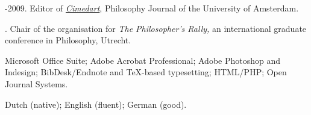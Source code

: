 \documentclass[11pt]{article}
\begin{document}
-2009. Editor of \href{http://www.cimedart.nl}{\emph{Cimedart}}, Philosophy Journal of the University of Amsterdam.

. Chair of the organisation for \emph{The Philosopher's Rally,} an international graduate conference in Philosophy, Utrecht.

\bigskip 

\medskip

\ind Microsoft Office Suite; Adobe Acrobat Professional; Adobe Photoshop and Indesign; BibDesk/Endnote and TeX-based typesetting; HTML/PHP; Open Journal Systems.

\bigskip 

\medskip

\ind Dutch (native); English (fluent); German (good).

\rfoot{\footnotesize{\today}}
\end{document}
